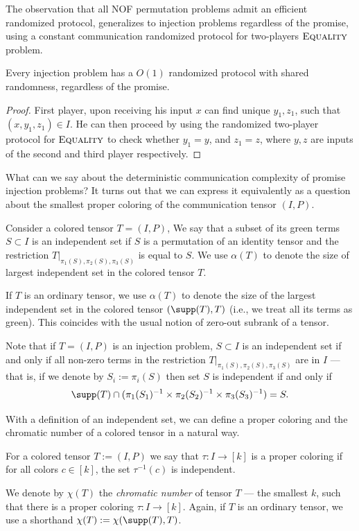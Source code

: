 The observation that all NOF permutation problems admit an efficient randomized protocol, generalizes to injection problems regardless of the promise, using a constant communication randomized protocol for two-players $\textsc{Equality}$ problem.
\begin{fact}
Every injection problem has a $O(1)$ randomized protocol with shared randomness, regardless of the promise.
\end{fact}
\begin{proof}
First player, upon receiving his input $x$ can find unique $y_1, z_1$, such that $(x,y_1, z_1) \in I$. He can then proceed by using the randomized two-player protocol for $\textsc{Equality}$ to check whether $y_1 = y$, and $z_1 = z$, where $y,z$ are inputs of the second and third player respectively.
\end{proof}

What can we say about the deterministic communication complexity of promise injection problems? It turns out that we can express it equivalently as a question about the smallest proper coloring of the communication tensor $(I, P)$.
\begin{definition}
Consider a colored tensor $T = (I, P)$, We say that a subset of its green terms $S \subset I$ is an independent set if $S$ is a permutation of an identity tensor and the restriction $T|_{\pi_1(S), \pi_2(S), \pi_3(S)}$ is equal to $S$. We use $\alpha(T)$ to denote the size of largest independent set in the colored tensor $T$.
\end{definition}

If $T$ is an ordinary tensor, we use $\alpha(T)$ to denote the size of the largest independent set in the colored tensor $(\supp(T), T)$ (i.e., we treat all its terms as green). This coincides with the usual notion of zero-out subrank of a tensor.

Note that if $T = (I, P)$ is an injection problem, $S \subset I$ is an independent set if and only if all non-zero terms in the restriction $T|_{\pi_1(S), \pi_2(S), \pi_3(S)}$ are in $I$ --- that is, if we denote by $S_i := \pi_i(S)$ then set $S$ is independent if and only if 
\begin{equation*}
    \supp(T) \cap (\pi_1(S_1)^{-1} \times \pi_2(S_2)^{-1} \times \pi_3(S_3)^{-1}) = S.
\end{equation*}

With a definition of an independent set, we can define a proper coloring and the chromatic number of a colored tensor in a natural way.
\begin{definition}
For a colored tensor $T := (I, P)$  we say that $\tau : I \to [k]$ is a proper coloring if for all colors $c\in [k]$, the set $\tau^{-1}(c)$ is independent.

We denote by $\chi(T)$ the \emph{chromatic number} of tensor $T$ --- the smallest $k$, such that there is a proper coloring $\tau : I \to [k]$. Again, if $T$ is an ordinary tensor, we use a shorthand $\chi(T) := \chi(\supp(T), T)$.
\end{definition}

